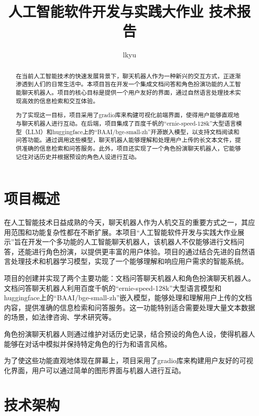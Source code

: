 \documentclass[lang=cn,a4paper,founder,bibend=bibtex,citestyle=gb7714-2015, bibstyle=gb7714-2015]{elegantpaper}
\title{人工智能软件开发与实践大作业 技术报告} %
\author{lkyu} %
\institute{} %
\date{\zhdate{2024/09/08}} %
\begin{document}
\maketitle

\begin{abstract} %

	在当前人工智能技术的快速发展背景下，聊天机器人作为一种新兴的交互方式，正逐渐渗透到人们的日常生活中。本项目旨在开发一个集成文档问答和角色扮演功能的人工智能聊天机器人。项目的核心目标是提供一个用户友好的界面，通过自然语言处理技术实现高效的信息检索和交互体验。

	为了实现这一目标，项目采用了gradio库来构建可视化前端界面，使得用户能够直观地与聊天机器人进行互动。在后端，项目集成了百度千帆的“ernie-speed-128k”大型语言模型（LLM）和huggingface上的“BAAI/bge-small-zh”开源嵌入模型，以支持文档阅读和问答功能。通过调用这些模型，聊天机器人能够理解和处理用户上传的长文本文件，提供准确的信息检索和问答服务。此外，项目还实现了一个角色扮演聊天机器人，它能够记住对话历史并根据预设的角色人设进行互动。
\end{abstract}

\section{项目概述} %

在人工智能技术日益成熟的今天，聊天机器人作为人机交互的重要方式之一，其应用范围和功能复杂性都在不断扩展\cite{konstantin_barabanov_zafar_jafarov_zafar_jafarov_2024}。本项目“人工智能软件开发与实践大作业展示”旨在开发一个多功能的人工智能聊天机器人，该机器人不仅能够进行文档问答，还能进行角色扮演，以提供更丰富的用户体验。项目的通过结合先进的自然语言处理技术和机器学习模型，实现了一个能够理解和响应用户需求的智能系统。

项目的创建并实现了两个主要功能：文档问答聊天机器人和角色扮演聊天机器人。文档问答聊天机器人利用百度千帆的“ernie-speed-128k”大型语言模型和huggingface上的“BAAI/bge-small-zh”嵌入模型，能够处理和理解用户上传的文档内容，提供准确的信息检索和问答服务。这一功能特别适合需要处理大量文本数据的场景，如法律咨询、学术研究等。

角色扮演聊天机器人则通过维护对话历史记录，结合预设的角色人设，使得机器人能够在对话中模拟并保持特定角色的行为和语言风格。

为了使这些功能直观地体现在屏幕上，项目采用了gradio库来构建用户友好的可视化界面，用户可以通过简单的图形界面与机器人进行互动。

\section{技术架构}
\end{document}

